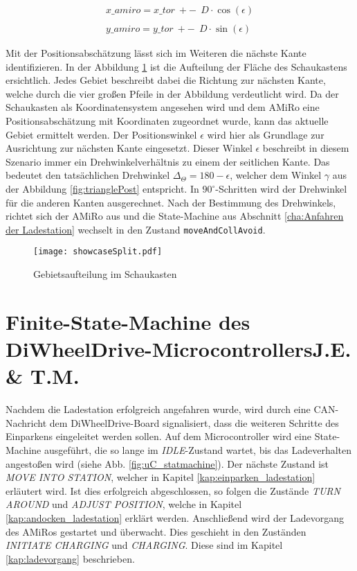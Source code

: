 \begin{equation}
	\begin{aligned}
		x\_amiro = x\_tor~+-~~D \cdot \cos(\epsilon) \\\\
		y\_amiro = y\_tor~+-~~D \cdot \sin(\epsilon)
		\label{eq:positionCoords}
	\end{aligned}
\end{equation}

Mit der Positionsabschätzung lässt sich im Weiteren die nächste Kante identifizieren. In der Abbildung \ref{fig:showcaseSplit} ist die Aufteilung der Fläche des Schaukastens ersichtlich. Jedes Gebiet beschreibt dabei die Richtung zur nächsten Kante, welche durch die vier großen Pfeile in der Abbildung verdeutlicht wird. Da der Schaukasten als Koordinatensystem angesehen wird und dem AMiRo eine Positionsabschätzung mit Koordinaten zugeordnet wurde, kann das aktuelle Gebiet ermittelt werden. Der Positionswinkel $\epsilon$ wird hier als Grundlage zur Ausrichtung zur nächsten Kante eingesetzt. Dieser Winkel $\epsilon$ beschreibt in diesem Szenario immer ein Drehwinkelverhältnis zu einem der seitlichen Kante. Das bedeutet den tatsächlichen Drehwinkel $\Delta_\Theta = 180 - \epsilon$, welcher dem Winkel $\gamma$ aus der Abbildung \ref{fig:trianglePost} entspricht. In $90^\circ$-Schritten wird der Drehwinkel für die anderen Kanten ausgerechnet. Nach der Bestimmung des Drehwinkels, richtet sich der AMiRo aus und die State-Machine aus Abschnitt \ref{cha:Anfahren der Ladestation} wechselt in den Zustand \texttt{moveAndCollAvoid}.

\begin{figure}[h]
	\begin{center}
		\texttt{[image: showcaseSplit.pdf]} 	
		\caption{Gebietsaufteilung im Schaukasten}
		\label{fig:showcaseSplit}
	\end{center}
\end{figure}

\section[Finite-State-Machine des DiWheelDrive-Microcontrollers]{Finite-State-Machine des DiWheelDrive-Microcontrollers\hfill {\normalsize J.E. \& T.M.}} %

Nachdem die Ladestation erfolgreich angefahren wurde, wird durch eine CAN-Nachricht dem DiWheelDrive-Board signalisiert, dass die weiteren Schritte des Einparkens eingeleitet werden sollen.
Auf dem Microcontroller wird eine State-Machine ausgeführt, die so lange im \textit{IDLE}-Zustand wartet, bis das Ladeverhalten angestoßen wird (siehe Abb. \ref{fig:uC_statmachine}).
Der nächste Zustand ist \textit{MOVE INTO STATION}, welcher in Kapitel \ref{kap:einparken_ladestation} erläutert wird. Ist dies erfolgreich abgeschlossen, so folgen die Zustände \textit{TURN AROUND} und \textit{ADJUST POSITION}, welche in Kapitel \ref{kap:andocken_ladestation} erklärt werden. Anschließend wird der Ladevorgang des AMiRos gestartet und überwacht. Dies geschieht in den Zuständen \textit{INITIATE CHARGING} und \textit{CHARGING}. Diese sind im Kapitel \ref{kap:ladevorgang} beschrieben.

